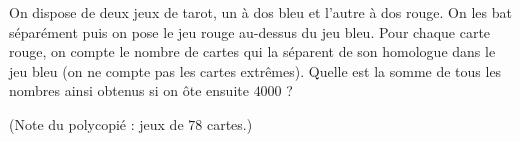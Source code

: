 On dispose de deux jeux de tarot, un à dos bleu et l'autre à dos rouge. On les bat séparément puis on pose le jeu rouge au-dessus du jeu bleu. Pour chaque carte rouge, on compte le nombre de cartes qui la séparent de son homologue dans le jeu bleu (on ne compte pas les cartes extrêmes). Quelle est la somme de tous les nombres ainsi obtenus si on ôte ensuite $4000$ ?

(Note du polycopié : jeux de $78$ cartes.)
